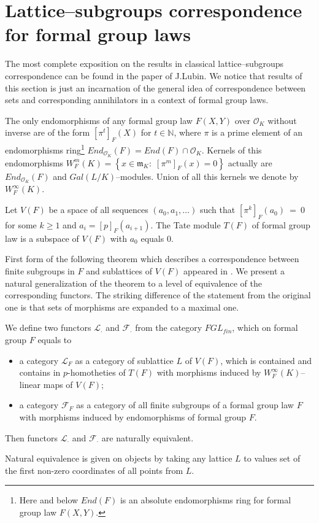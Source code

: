 \documentclass[
11pt,%
tightenlines,%
twoside,%
onecolumn,%
nofloats,%
nobibnotes,%
nofootinbib,%
superscriptaddress,%
noshowpacs,%
centertags]%
{revtex4}
\begin{document}
\section{Lattice--subgroups correspondence for formal group laws}
\label{corre}
The most complete exposition on the results in classical lattice--subgroups correspondence can be found in the paper \cite{Lubin} of J.Lubin. We notice that results of this section is just an incarnation of the general idea of correspondence between sets and corresponding annihilators in a context of formal group laws.

The only endomorphisms of any formal group law $F(X,Y)$ over $\mathcal{O}_{K}$ without inverse are of the form $[\pi^{t}]_{F}(X)$ for $t\in \mathbb{N}$, where $\pi$ is a prime element of an endomorphisms ring\footnote{Here and below $End(F)$ is an absolute endomorphisms ring \cite{Lubin1} for formal group law $F(X,Y)$.} $End_{\mathcal{O}_{K}}(F) = End(F) \cap \mathcal{O}_{K}$. Kernels of this endomorphisms $W_{F}^{m}(K) = \left\{ x \in \mathfrak{m}_{K}:\;[\pi^{m}]_{F}(x) = 0\right\}$ actually are $End_{\mathcal{O}_{K}}(F)$ and $Gal(L/K)$--modules. Union of all this kernels we denote by $W_{F}^{\infty}(K)$.

Let $V(F)$ be a space of all sequences $(a_{0}, a_{1}, \dots)$ such that $[\pi^{k}]_{F}(a_{0})~=~0$ for some $k\geq 1$ and $ a_{i}=[p]_{F}(a_{i+1})$. The Tate module $T(F)$ of formal group law is a subspace of $V(F)$ with $a_{0}$ equals $0$.

First form  of the following theorem which describes a correspondence between finite subgroups in $F$ and sublattices of $V(F)$ appeared in \cite{Lubin}. We present a natural generalization of the theorem to a level of equivalence of the corresponding functors. The striking difference of the statement from the original one is that sets of morphisms are expanded to a maximal one.

\begin{theorem}\label{cor}
We define two functors $\mathcal{L}_{\cdot}$ and $\mathcal{F}_{\cdot}$ from the category $FGL_{fin}$, which on formal group $F$ equals to
\begin{itemize}
\item a category $\mathcal{L}_{F}$ as a category of sublattice $L$ of $V(F)$, which is contained and contains in $p$-homotheties of $T(F)$ with morphisms induced by $W_{F}^{\infty}(K)$--linear maps of $V(F)$;
\item a category $\mathcal{F}_{F}$ as a category of all finite subgroups of a formal group law $F$ with morphisms induced by endomorphisms of formal group $F$.
\end{itemize}
Then functors $\mathcal{L}_{\cdot}$ and $\mathcal{F}_{\cdot}$ are naturally equivalent.

Natural equivalence is given on objects by taking any lattice $L$ to values set of the first non-zero coordinates of all points from $L$.
\end{theorem}
\end{document}
